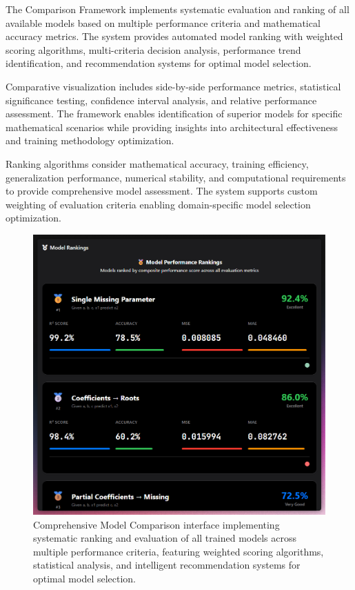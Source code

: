 \documentclass[11pt,a4paper]{report}
\begin{document}
The Comparison Framework implements systematic evaluation and ranking of all available models based on multiple performance criteria and mathematical accuracy metrics. The system provides automated model ranking with weighted scoring algorithms, multi-criteria decision analysis, performance trend identification, and recommendation systems for optimal model selection.

Comparative visualization includes side-by-side performance metrics, statistical significance testing, confidence interval analysis, and relative performance assessment. The framework enables identification of superior models for specific mathematical scenarios while providing insights into architectural effectiveness and training methodology optimization.

Ranking algorithms consider mathematical accuracy, training efficiency, generalization performance, numerical stability, and computational requirements to provide comprehensive model assessment. The system supports custom weighting of evaluation criteria enabling domain-specific model selection optimization.

\begin{figure}[H]
\centering
\includegraphics[width=\textwidth]{quadratic_predictor_model_comparison.png}
\caption{Comprehensive Model Comparison interface implementing systematic ranking and evaluation of all trained models across multiple performance criteria, featuring weighted scoring algorithms, statistical analysis, and intelligent recommendation systems for optimal model selection.}
\label{fig:quadratic_comparison}
\end{figure}
\end{document}

